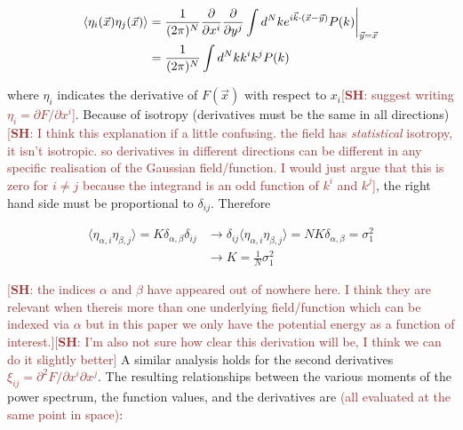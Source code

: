 \documentclass[12pt]{article}
\newcommand{\SH}[1]{\textcolor{brown}{[{\bf SH}: #1]}}
\newcommand{\sh}[1]{\textcolor{brown}{#1}}
\begin{document}
\begin{align*}
\langle \eta_{i}(\vec{x})\eta_{j}(\vec{x})\rangle &= \frac{1}{(2\pi)^N} \frac{\partial}{\partial x^i}\frac{\partial}{\partial y^j} \int d^Nk e^{i \vec{k} \cdot (\vec{x}-\vec{y})} P(k)\bigg{|}_{\vec{y}=\vec{x}}\\
&= \frac{1}{(2\pi)^N}\int d^Nk k^i k^j P(k)
\end{align*}

\noindent where $\eta_{i}$ indicates the derivative of $F(\vec{x})$ with respect to $x_i$\SH{suggest writing $\eta_i=\partial F/\partial x^i $}. Because of isotropy (derivatives must be the same in all directions)\SH{I think this explanation if a little confusing. the field has \emph{statistical} isotropy, it isn't isotropic. so derivatives in different directions can be different in any specific realisation of the Gaussian field/function. I would just argue that this is zero for $i\neq j$ because the integrand is an odd function of $k^i$ and $k^j$}, the right hand side must be proportional to $\delta_{ij}$. Therefore

\begin{align*}
\langle \eta_{\alpha,i}\eta_{\beta,j}\rangle = K \delta_{\alpha,\beta}\delta_{ij} &\rightarrow \delta_{ij}\langle \eta_{\alpha,i}\eta_{\beta,j}\rangle = NK \delta_{\alpha,\beta}=\sigma_1^2\\
&\rightarrow K = \frac{1}{N}\sigma_1^2
\end{align*}

\SH{the indices $\alpha$ and $\beta$ have appeared out of nowhere here. I think they are relevant when thereis more than one underlying field/function which can be indexed via $\alpha$ but in this paper we only have the potential energy as a function of interest.}\SH{I'm also not sure how clear this derivation will be, I think we can do it slightly better} A similar analysis holds for the second derivatives \sh{$\xi_{ij}=\partial^2 F/\partial x^i \partial x^j$}. The resulting relationships between the various moments of the power spectrum, the function values, and the derivatives are \sh
{(all evaluated at the same point in space)}:

\end{document}
